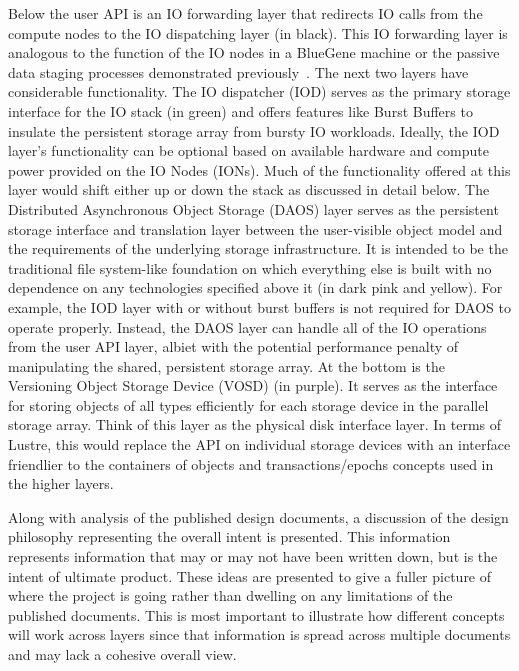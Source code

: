 \documentclass[conference]{IEEEtran}
\begin{document}
Below the user API is an IO forwarding layer that redirects IO calls from the
compute nodes to the IO dispatching layer (in black).  This IO forwarding layer
is analogous to the function of the IO nodes in a BlueGene machine or the
passive data staging processes demonstrated
previously~\cite{nisar:2008:staging,Abbasi:2009:datatap}. The next two layers
have considerable functionality. The IO dispatcher (IOD) serves as the primary
storage interface for the IO stack (in green) and offers features like Burst
Buffers to insulate the persistent storage array from bursty IO workloads.
Ideally, the IOD layer's functionality can be optional based on available
hardware and compute power provided on the IO Nodes (IONs). Much of the
functionality offered at this layer would shift either up or down the stack as
discussed in detail below. The Distributed Asynchronous Object Storage (DAOS)
layer serves as the persistent storage interface and translation layer between
the user-visible object model and the requirements of the underlying storage
infrastructure. It is intended to be the traditional file system-like
foundation on which everything else is built with no dependence on any
technologies specified above it (in dark pink and yellow). For example, the IOD
layer with or without burst buffers is not required for DAOS to operate
properly.  Instead, the DAOS layer can handle all of the IO operations from the
user API layer, albiet with the potential performance penalty of manipulating
the shared, persistent storage array. At the bottom is the Versioning Object
Storage Device (VOSD) (in purple).  It serves as the interface for storing
objects of all types efficiently for each storage device in the parallel
storage array. Think of this layer as the physical disk interface layer. In
terms of Lustre, this would replace the API on individual storage devices with
an interface friendlier to the containers of objects and transactions/epochs
concepts used in the higher layers.

Along with analysis of the published design documents, a discussion of the
design philosophy representing the overall intent is presented. This
information represents information that may or may not have been written down,
but is the intent of ultimate product.  These ideas are presented to give a
fuller picture of where the project is going rather than dwelling on any
limitations of the published documents. This is most important to illustrate
how different concepts will work across layers since that information is spread
across multiple documents and may lack a cohesive overall view.
\end{document}
